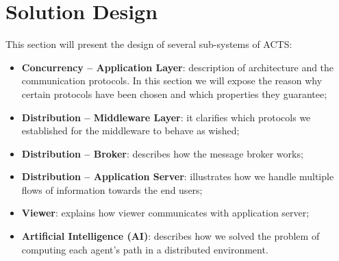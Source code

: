 \section{Solution Design}

This section will present the design of several sub-systems of ACTS:

\begin{itemize}
\item \textbf{Concurrency -- Application Layer}:
  description of architecture and the communication protocols.
  In this section we
  will expose the reason why certain protocols have been chosen and which
  properties they guarantee;
\item \textbf{Distribution -- Middleware Layer}:
  it clarifies which protocols
  we established for the middleware to behave as wished;
\item \textbf{Distribution -- Broker}:
  describes how the message broker works;
\item \textbf{Distribution -- Application Server}:
  illustrates how we handle multiple flows of information towards the end
  users;
\item \textbf{Viewer}:
  explains how viewer communicates with application server;
\item \textbf{Artificial Intelligence (AI)}:
  describes how we solved the problem of computing each agent's path
  in a distributed environment.
\end{itemize}







